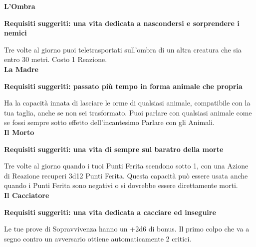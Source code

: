 \begin{multicols}{2}
\Large\textbf{L'Ombra}\normalsize{}

\textbf{Requisiti suggeriti: una vita dedicata a nascondersi e sorprendere i nemici}

Tre volte al giorno puoi teletrasportati sull'ombra di un altra creatura che sia entro 30 metri. Costo 1 Reazione.\\

\Large\textbf{La Madre}\normalsize{}

\textbf{Requisiti suggeriti: passato più tempo in forma animale che propria}

Ha la capacità innata di lasciare le orme di qualsiasi animale, compatibile con la tua taglia, anche se non sei trasformato. Puoi parlare con qualsiasi animale come se fossi sempre sotto effetto dell'incantesimo Parlare con gli Animali.\\

\Large\textbf{Il Morto}\normalsize{}

\textbf{Requisiti suggeriti: una vita di sempre sul baratro della morte}

Tre volte al giorno quando i tuoi Punti Ferita scendono sotto 1, con una Azione di Reazione recuperi 3d12 Punti Ferita. Questa capacità può essere usata anche quando i Punti Ferita sono negativi o si dovrebbe essere direttamente morti.\\

\Large\textbf{Il Cacciatore}\normalsize{}

\textbf{Requisiti suggeriti: una vita dedicata a cacciare ed inseguire}

Le tue prove di Sopravvivenza hanno un +2d6 di bonus. Il primo colpo che va a segno contro un avversario ottiene automaticamente 2 critici.


\end{multicols}

\pagebreak

